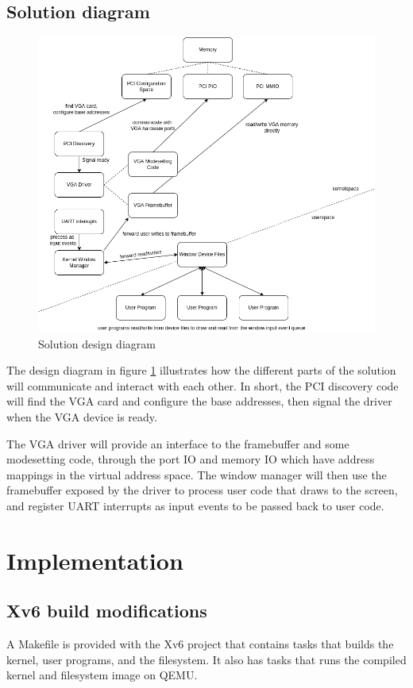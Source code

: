 \subsection{Solution diagram}
\begin{figure}[H]
    \centering
    \includegraphics[width=16cm]{diagram.drawio.png}
    \caption{Solution design diagram}
    \label{figure:3}
\end{figure}

The design diagram in figure \ref{figure:3} illustrates how the different parts
of the solution will communicate and interact with each other. In short, the PCI
discovery code will find the VGA card and configure the base addresses, then signal
the driver when the VGA device is ready. 

The VGA driver will provide an interface to the framebuffer and some modesetting code, through the port IO and memory IO which
have address mappings in the virtual address space. The window manager will then use
the framebuffer exposed by the driver to process user code that draws to the screen,
and register UART interrupts as input events to be passed back to user code.

\section{Implementation}

\subsection{Xv6 build modifications}
A Makefile is provided with the Xv6 project that contains tasks that builds the
kernel, user programs, and the filesystem. It also has tasks that runs the compiled
kernel and filesystem image on QEMU.

